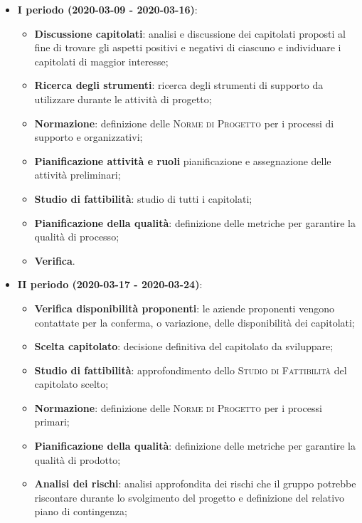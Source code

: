 \documentclass[../piano-di-progetto.tex]{subfiles}
\begin{document}
\begin{itemize}

    \item \textbf{I periodo (2020-03-09 - 2020-03-16)}:
        \begin{itemize}
            \item \textbf{Discussione capitolati}: analisi e discussione dei capitolati proposti al fine di trovare gli aspetti positivi e negativi di ciascuno e individuare i capitolati di maggior interesse;
            \item \textbf{Ricerca degli strumenti}: ricerca degli strumenti di supporto da utilizzare durante le attività di progetto;
            \item \textbf{Normazione}: definizione delle \textsc{Norme di Progetto} per i processi di supporto e organizzativi;
            \item \textbf{Pianificazione attività e ruoli} pianificazione e assegnazione delle attività preliminari;
            \item \textbf{Studio di fattibilità}: studio di tutti i capitolati;
            \item \textbf{Pianificazione della qualità}: definizione delle metriche per garantire la qualità di processo;
            \item \textbf{Verifica}.
        \end{itemize}
        \item \textbf{II periodo (2020-03-17 - 2020-03-24)}:
            \begin{itemize}
                \item \textbf{Verifica disponibilità proponenti}: le aziende proponenti vengono contattate per la conferma, o variazione, delle disponibilità dei capitolati;
                \item \textbf{Scelta capitolato}: decisione definitiva del capitolato da sviluppare;
                \item \textbf{Studio di fattibilità}: approfondimento dello \textsc{Studio di Fattibilità} del capitolato scelto;
                \item \textbf{Normazione}: definizione delle \textsc{Norme di Progetto} per i processi primari;
                \item \textbf{Pianificazione della qualità}: definizione delle metriche per garantire la qualità di prodotto;
                \item \textbf{Analisi dei rischi}: analisi approfondita dei rischi che il gruppo potrebbe riscontare durante lo svolgimento del progetto e definizione del relativo piano di contingenza;

\end{itemize}
\end{itemize}
\end{document}
